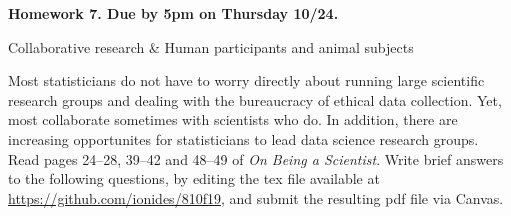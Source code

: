 \documentclass[12pt]{article}
\begin{document}
\begin{center}\bf
Homework 7. Due by 5pm on Thursday 10/24.

Collaborative research \& Human participants and animal subjects

\end{center}
Most statisticians do not have to worry directly about running large scientific research groups and dealing with the bureaucracy of ethical data collection. Yet, most collaborate sometimes with scientists who do. In addition, there are increasing opportunites for statisticians to lead data science research groups. Read pages 24--28, 39--42 and 48--49 of {\em On Being a Scientist}.  Write brief answers to the following questions, by editing the tex file available at \url{https://github.com/ionides/810f19}, and submit the resulting pdf file via Canvas.
\end{document}
